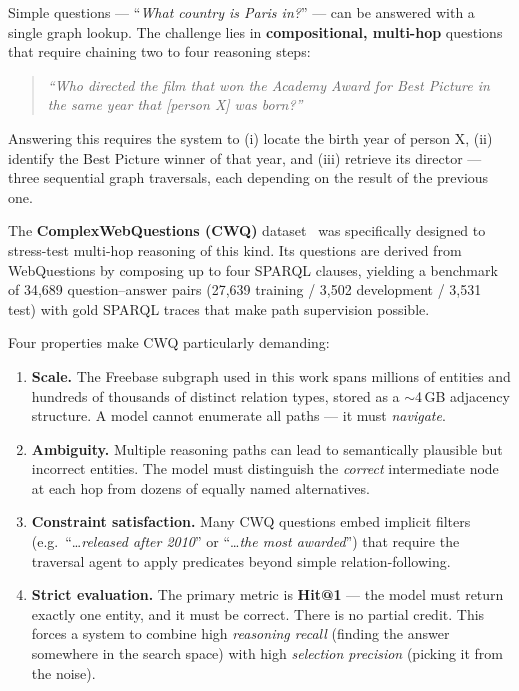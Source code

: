 \documentclass[11pt,a4paper]{article}
\begin{document}
Simple questions --- ``\emph{What country is Paris in?}'' --- can be
answered with a single graph lookup.
The challenge lies in \textbf{compositional, multi-hop} questions that
require chaining two to four reasoning steps:

\begin{quote}
  \emph{``Who directed the film that won the Academy Award for Best Picture
  in the same year that [person X] was born?''}
\end{quote}

Answering this requires the system to (i) locate the birth year of person X,
(ii) identify the Best Picture winner of that year, and (iii) retrieve its
director --- three sequential graph traversals, each depending on the result
of the previous one.

The \textbf{ComplexWebQuestions (CWQ)} dataset~\cite{talmor2018web} was
specifically designed to stress-test multi-hop reasoning of this kind.
Its questions are derived from WebQuestions by composing up to four SPARQL
clauses, yielding a benchmark of 34,689 question--answer pairs
(27,639 training / 3,502 development / 3,531 test) with gold SPARQL traces
that make path supervision possible.

Four properties make CWQ particularly demanding:
\begin{enumerate}
  \item \textbf{Scale.} The Freebase subgraph used in this work spans
        millions of entities and hundreds of thousands of distinct relation
        types, stored as a $\sim$4\,GB adjacency structure.
        A model cannot enumerate all paths --- it must \emph{navigate}.
  \item \textbf{Ambiguity.} Multiple reasoning paths can lead to
        semantically plausible but incorrect entities.
        The model must distinguish the \emph{correct} intermediate node
        at each hop from dozens of equally named alternatives.
  \item \textbf{Constraint satisfaction.} Many CWQ questions embed
        implicit filters (e.g.\ ``\ldots \emph{released after 2010}'' or
        ``\ldots \emph{the most awarded}'') that require the traversal
        agent to apply predicates beyond simple relation-following.
  \item \textbf{Strict evaluation.} The primary metric is
        \textbf{Hit@1} --- the model must return exactly one entity,
        and it must be correct.
        There is no partial credit.
        This forces a system to combine high \emph{reasoning recall}
        (finding the answer somewhere in the search space) with high
        \emph{selection precision} (picking it from the noise).
\end{enumerate}
\end{document}
